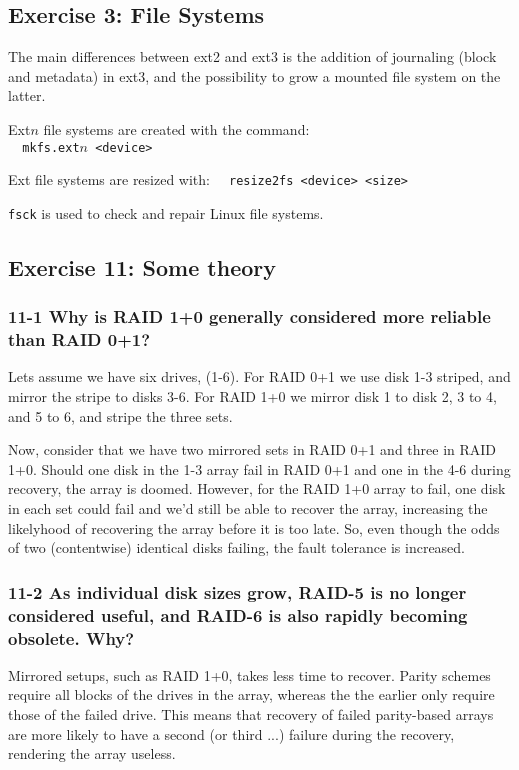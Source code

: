 \subsection{Exercise 3: File Systems}

The main differences between ext2 and ext3 is the addition of journaling (block and metadata) in ext3, and the possibility to grow a mounted file system on the latter.

Ext$n$ file systems are created with the command: \\
\verb=  mkfs.ext=$n$\verb= <device>=

Ext file systems are resized with:
\verb=  resize2fs <device> <size>=

\verb=fsck= is used to check and repair Linux file systems.

\subsection{Exercise 11: Some theory}
\subsubsection{11-1 Why is RAID 1+0 generally considered more reliable than RAID 0+1?}
Lets assume we have six drives, (1-6). For RAID 0+1 we use disk 1-3 striped, and mirror the stripe to disks 3-6. For RAID 1+0 we mirror disk 1 to disk 2, 3 to 4, and 5 to 6, and stripe the three sets.

Now, consider that we have two mirrored sets in RAID 0+1 and three in RAID 1+0. Should one disk in the 1-3 array fail in RAID 0+1 and one in the 4-6 during recovery, the array is doomed. However, for the RAID 1+0 array to fail, one disk in each set could fail and we'd still be able to recover the array, increasing the likelyhood of recovering the array before it is too late. So, even though the odds of two (contentwise) identical disks failing, the fault tolerance is increased.

\subsubsection{11-2 As individual disk sizes grow, RAID-5 is no longer considered useful, and RAID-6 is also rapidly becoming obsolete. Why?}
Mirrored setups, such as RAID 1+0, takes less time to recover. Parity schemes require all blocks of the drives in the array, whereas the the earlier only require those of the failed drive. This means that recovery of failed parity-based arrays are more likely to have a second (or third ...) failure during the recovery, rendering the array useless.

